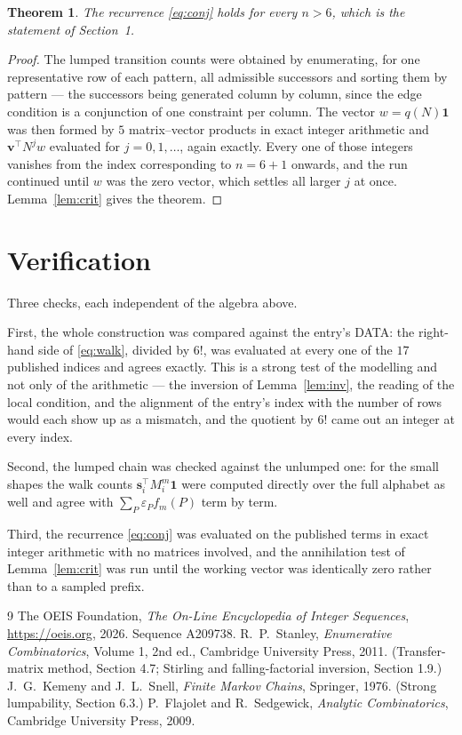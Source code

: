 \documentclass[11pt,a4paper]{article}
\theoremstyle{plain}
\newtheorem{theorem}{Theorem}
\theoremstyle{definition}
\begin{document}
\begin{theorem}
The recurrence \eqref{eq:conj} holds for every $n>6$, which is the statement of
Section~1.
\end{theorem}

\begin{proof}
The lumped transition counts were obtained by enumerating, for one representative row of
each pattern, all admissible successors and sorting them by pattern --- the successors being
generated column by column, since the edge condition is a conjunction of one constraint per
column. The vector $w=q(N)\mathbf{1}$ was then formed by $5$ matrix--vector products
in exact integer arithmetic and $\mathbf{v}^{\!\top}N^{j}w$ evaluated for
$j=0,1,\dots$, again exactly. Every one of those integers vanishes from the index
corresponding to $n=6+1$ onwards, and the run continued until $w$ was the zero vector,
which settles all larger $j$ at once. Lemma~\ref{lem:crit} gives the theorem.
\end{proof}

\section{Verification}

Three checks, each independent of the algebra above.

First, the whole construction was compared against the entry's DATA: the right-hand side of
\eqref{eq:walk}, divided by $6!$, was evaluated at every one of the $17$
published indices and agrees exactly. This is a strong test of the modelling and not only of
the arithmetic --- the inversion of Lemma~\ref{lem:inv}, the reading of the local
condition, and the alignment of the entry's index with the number of rows would each
show up as a mismatch, and the quotient by $6!$ came out an integer at every index.

Second, the lumped chain was checked against the unlumped one: for the small shapes the walk
counts $\mathbf{s}_i^{\!\top}M_i^{m}\mathbf{1}$ were computed directly over the full
alphabet as well and agree with $\sum_P\varepsilon_Pf_m(P)$ term by term.

Third, the recurrence \eqref{eq:conj} was evaluated on the published terms in exact integer
arithmetic with no matrices involved, and the annihilation test of Lemma~\ref{lem:crit} was
run until the working vector was identically zero rather than to a sampled prefix.

\begin{thebibliography}{9}
 The OEIS Foundation, \emph{The On-Line Encyclopedia of Integer
Sequences}, \url{https://oeis.org}, 2026. Sequence A209738.
 R.~P.~Stanley, \emph{Enumerative Combinatorics}, Volume 1, 2nd ed.,
Cambridge University Press, 2011. (Transfer-matrix method, Section 4.7; Stirling and
falling-factorial inversion, Section 1.9.)
 J.~G.~Kemeny and J.~L.~Snell, \emph{Finite Markov Chains}, Springer,
1976. (Strong lumpability, Section 6.3.)
 P.~Flajolet and R.~Sedgewick, \emph{Analytic Combinatorics}, Cambridge
University Press, 2009.
\end{thebibliography}
\end{document}
